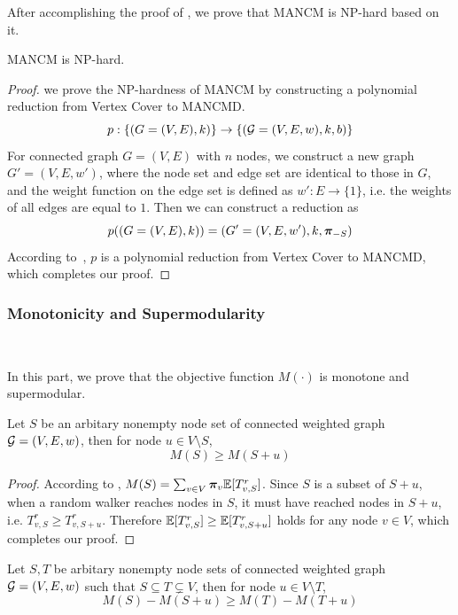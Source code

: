\documentclass[sigconf]{acmart}
\begin{document}
After accomplishing the proof of , we prove that MANCM is NP-hard based on it.
\begin{theorem}\label{thm:np-hard}
    MANCM is NP-hard.
\end{theorem}
\begin{proof}
    we prove the NP-hardness of MANCM by constructing a polynomial reduction from Vertex Cover to MANCMD.
    \[p:\{(G=(V,E),k)\}\to\{(\mathcal{G}=(V,E,w),k,b)\}\]
    For connected graph \(G=(V,E)\) with \(n\) nodes, we construct a new graph \(G'=(V,E,w')\), where the node set and edge set are identical to those in \(G\), and the weight function on the edge set is defined as \(w':E\to\{1\}\), i.e. the weights of all edges are equal to \(1\). Then we can construct a reduction as
    \[p((G=(V,E),k))=(G'=(V,E,w'),k,\boldsymbol{\pi}_{-S})\]
    According to~, \(p\) is a polynomial reduction from Vertex Cover to MANCMD, which completes our proof.
\end{proof}

\subsubsection{Monotonicity and Supermodularity}

\

In this part, we prove that the objective function \(M(\cdot)\) is monotone and supermodular.
\begin{theorem}[Monotonicity]\label{thm:mono}
    Let \(S\) be an arbitary nonempty node set of connected weighted graph \(\mathcal{G}=(V,E,w)\), then for node \(u\in V\setminus S\),
    \[M(S)\ge M(S+u)\]
\end{theorem}

\begin{proof}
    According to , \(M(S)=\sum_{v\in V}\boldsymbol{\pi}_v\mathbb{E}[T_{v,S}^r]\). Since \(S\) is a subset of \(S+u\), when a random walker reaches nodes in \(S\), it must have reached nodes in \(S+u\), i.e. \(T_{v,S}^r\ge T_{v,S+u}^r\). Therefore \(\mathbb{E}[T_{v,S}^r]\ge\mathbb{E}[T_{v,S+u}^r]\) holds for any node \(v\in V\), which completes our proof.
\end{proof}

\begin{theorem}[Supermodularity]\label{thm:supermod}
    Let \(S,T\) be arbitary nonempty node sets of connected weighted graph \(\mathcal{G}=(V,E,w)\) such that \(S\subseteq T\subsetneq V\), then for node \(u\in V\setminus T\),
    \[M(S)-M(S+u)\ge M(T)-M(T+u)\]
\end{theorem}
\end{document}

